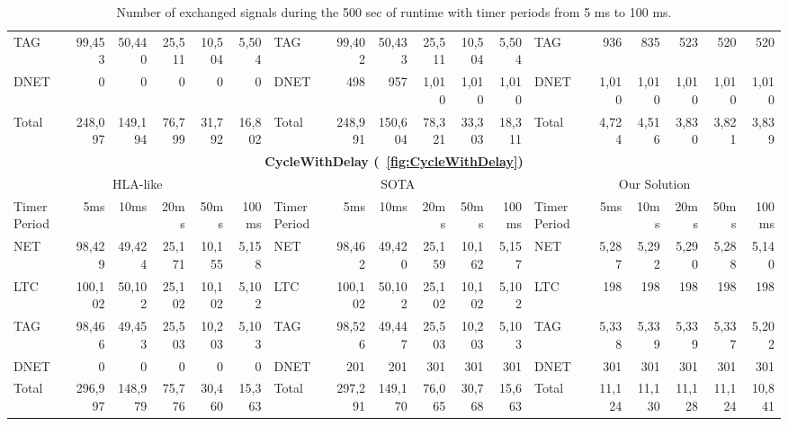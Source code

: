 \begin{table*}
\begin{tabular}{|l|rrrrr||l|rrrrr||l|rrrrr|}
		TAG & 99,453 & 50,440 & 25,511 & 10,504 & 5,504 & TAG & 99,402 & 50,433 & 25,511 & 10,504 & 5,504 & TAG & 936 & 835 & 523 & 520 & 520 \\
		DNET & 0 & 0 & 0 & 0 & 0 & DNET & 498 & 957 & 1,010 & 1,010 & 1,010 & DNET & 1,010 & 1,010 & 1,010 & 1,010 & 1,010 \\
		\hline
		Total & 248,097 & 149,194 & 76,799 & 31,792 & 16,802 & Total & 248,991 & 150,604 & 78,321 & 33,303 & 18,311 & Total & 4,724 & 4,516 & 3,830 & 3,821 & 3,839 \\
		\hline
%
		\hline
		\hline
		\multicolumn{18}{|c|}{\textbf{CycleWithDelay (\figurename~\ref{fig:CycleWithDelay})}} \\
		\hline
		\multicolumn{6}{|c||}{HLA-like} & \multicolumn{6}{|c||}{SOTA} & \multicolumn{6}{|c|}{Our Solution} \\
		\hline
		Timer Period \hspace{-5pt} & 5ms & 10ms & 20ms & 50ms & 100ms & Timer Period \hspace{-5pt} & 5ms & 10ms & 20ms & 50ms & 100ms & Timer Period \hspace{-5pt} & 5ms & 10ms & 20ms & 50ms & 100ms \\
		\hline
		NET & 98,429 & 49,424 & 25,171 & 10,155 & 5,158 & NET & 98,462 & 49,420 & 25,159 & 10,162 & 5,157 & NET & 5,287 & 5,292 & 5,290 & 5,288 & 5,140 \\
		LTC & 100,102 & 50,102 & 25,102 & 10,102 & 5,102 & LTC & 100,102 & 50,102 & 25,102 & 10,102 & 5,102 & LTC & 198 & 198 & 198 & 198 & 198 \\
		TAG & 98,466 & 49,453 & 25,503 & 10,203 & 5,103 & TAG & 98,526 & 49,447 & 25,503 & 10,203 & 5,103 & TAG & 5,338 & 5,339 & 5,339 & 5,337 & 5,202 \\
		DNET & 0 & 0 & 0 & 0 & 0 & DNET & 201 & 201 & 301 & 301 & 301 & DNET & 301 & 301 & 301 & 301 & 301 \\
		\hline
		Total & 296,997 & 148,979 & 75,776 & 30,460 & 15,363 & Total & 297,291 & 149,170 & 76,065 & 30,768 & 15,663 & Total & 11,124 & 11,130 & 11,128 & 11,124 & 10,841 \\
		\hline
	\end{tabular}
	
	\caption{Number of exchanged signals during the 500 sec of runtime with timer periods from 5 ms to 100 ms.}
	\label{tab:NumSignals}
\end{table*}